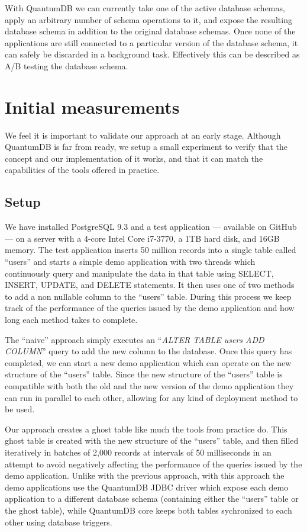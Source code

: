 \documentclass[conference]{IEEEtran}
\begin{document}
With QuantumDB we can currently take one of the active database schemas, apply an arbitrary number of schema operations to it, and expose the resulting database schema in addition to the original database schemas. Once none of the applications are still connected to a particular version of the database schema, it can safely be discarded in a background task. Effectively this can be described as A/B testing the database schema.

\section{Initial measurements} %

We feel it is important to validate our approach at an early stage. Although QuantumDB is far from ready, we setup a small experiment to verify that the concept and our implementation of it works, and that it can match the capabilities of the tools offered in practice. 

\subsection{Setup}
We have installed PostgreSQL 9.3 and a test application --- available on GitHub~\cite{QuantumDB-RelEng-Demo} --- on a server with a 4-core Intel Core i7-3770, a 1TB hard disk, and 16GB memory. The test application inserts 50 million records into a single table called ``users'' and starts a simple demo application with two threads which continuously query and manipulate the data in that table using SELECT, INSERT, UPDATE, and DELETE statements. It then uses one of two methods to add a non nullable column to the ``users'' table. During this process we keep track of the performance of the queries issued by the demo application and how long each method takes to complete. 

The ``naive'' approach simply executes an ``\textit{ALTER TABLE users ADD COLUMN}'' query to add the new column to the database. Once this query has completed, we can start a new demo application which can operate on the new structure of the ``users'' table. Since the new structure of the ``users'' table is compatible with both the old and the new version of the demo application they can run in parallel to each other, allowing for any kind of deployment method to be used. 

Our approach creates a ghost table like much the tools from practice do. This ghost table is created with the new structure of the ``users'' table, and then filled iteratively in batches of 2,000 records at intervals of 50 milliseconds in an attempt to avoid negatively affecting the performance of the queries issued by the demo application. Unlike with the previous approach, with this approach the demo applications use the QuantumDB JDBC driver which expose each demo application to a different database schema (containing either the ``users'' table or the ghost table), while QuantumDB core keeps both tables sychronized to each other using database triggers. 
\end{document}
